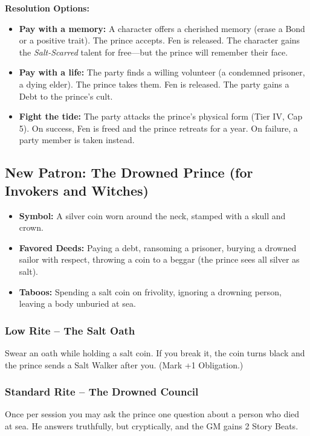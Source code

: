 \documentclass[12pt]{article}
\begin{document}
\textbf{Resolution Options:}
\begin{itemize}
  \item \textbf{Pay with a memory:} A character offers a cherished memory (erase a Bond or a positive trait). The prince accepts. Fen is released. The character gains the \textit{Salt-Scarred} talent for free---but the prince will remember their face.
  \item \textbf{Pay with a life:} The party finds a willing volunteer (a condemned prisoner, a dying elder). The prince takes them. Fen is released. The party gains a Debt to the prince's cult.
  \item \textbf{Fight the tide:} The party attacks the prince's physical form (Tier IV, Cap 5). On success, Fen is freed and the prince retreats for a year. On failure, a party member is taken instead.
\end{itemize}

\subsection{New Patron: The Drowned Prince (for Invokers and Witches)}
\begin{itemize}
  \item \textbf{Symbol:} A silver coin worn around the neck, stamped with a skull and crown.
  \item \textbf{Favored Deeds:} Paying a debt, ransoming a prisoner, burying a drowned sailor with respect, throwing a coin to a beggar (the prince sees all silver as salt).
  \item \textbf{Taboos:} Spending a salt coin on frivolity, ignoring a drowning person, leaving a body unburied at sea.
\end{itemize}

\subsubsection{Low Rite -- The Salt Oath}
Swear an oath while holding a salt coin. If you break it, the coin turns black and the prince sends a Salt Walker after you. (Mark +1 Obligation.)

\subsubsection{Standard Rite -- The Drowned Council}
Once per session you may ask the prince one question about a person who died at sea. He answers truthfully, but cryptically, and the GM gains 2 Story Beats.
\end{document}
